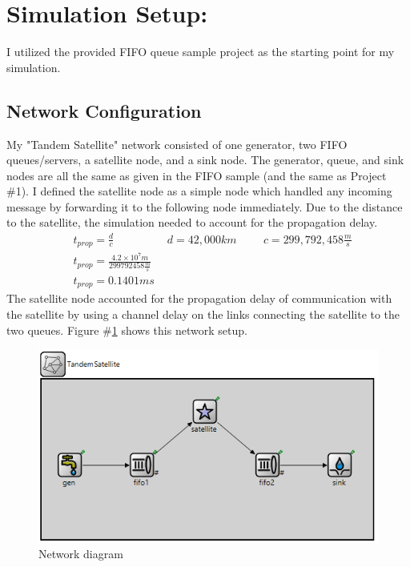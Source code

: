 \documentclass{article}
\begin{document}

\section*{Simulation Setup:}
I utilized the provided FIFO queue sample project as the starting point for my simulation.

\subsection*{Network Configuration}  
My "Tandem Satellite" network consisted of one generator, two FIFO queues/servers, a satellite node, and a sink node.  
The generator, queue, and sink nodes are all the same as given in the FIFO sample (and the same as Project \#1).  
I defined the satellite node as a simple node which handled any incoming message by forwarding it to the following node immediately.  
Due to the distance to the satellite, the simulation needed to account for the propagation delay.
\begin{align*}
& t_{prop} = \frac{d}{c} \hspace{2cm} d = 42,000km  \hspace{1cm} c = 299,792,458 \frac{m}{s} \\
& t_{prop} = \frac{4.2 \times 10^7 m}{299792458 \frac{m}{s}} \\
& \boxed{t_{prop} = 0.1401 ms}
\end{align*}
The satellite node accounted for the propagation delay of communication with the satellite by using a channel delay on the links connecting the satellite to the two queues.
Figure \#\ref{diagram} shows this network setup. 

\begin{figure}[h!]
	\begin{center}
	\includegraphics[scale=1.0]{Images/TandemSatellite.PNG}
	\vspace{-.25cm}
	\caption{Network diagram}
	\label{diagram}
	\end{center}
\end{figure}
\end{document}
